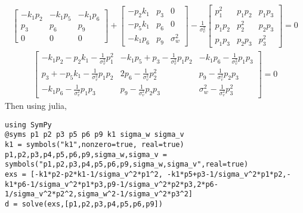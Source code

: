 \documentclass[paper=a4, fontsize=11pt]{scrartcl}
\numberwithin{equation}{section}		%
\numberwithin{figure}{section}			%
\numberwithin{table}{section}				%
\begin{document}
\begin{align*}
\begin{bmatrix}
-k_1p_2&-k_1p_5&-k_1p_6\\
p_3&p_6&p_9\\
0&0&0
\end{bmatrix}+
\begin{bmatrix}
-p_2k_1&p_3&0\\
-p_5k_1&p_6&0\\
-k_1p_6&p_9&\sigma_w^2
\end{bmatrix}-\frac{1}{\sigma_v^2}
\begin{bmatrix}
p_1^2&p_1p_2&p_1p_3\\
p_1p_2&p_2^2&p_2p_3\\
p_1p_3&p_2p_3&p_3^2
\end{bmatrix}=0
\end{align*}
\begin{align*}
\begin{bmatrix}
-k_1p_2-p_2k_1-\frac{1}{\sigma_v^2}p_1^2&-k_1p_5+p_3-\frac{1}{\sigma_v^2}p_1p_2&-k_1p_6-\frac{1}{\sigma_v^2}p_1p_3\\
p_3+-p_5k_1-\frac{1}{\sigma_v^2}p_1p_2&2p_6-\frac{1}{\sigma_v^2}p_2^2&p_9-\frac{1}{\sigma_v^2}p_2p_3\\
-k_1p_6-\frac{1}{\sigma_v^2}p_1p_3&p_9-\frac{1}{\sigma_v^2}p_2p_3&\sigma_w^2-\frac{1}{\sigma_v^2}p_3^2
\end{bmatrix}=0
\end{align*}
Then using julia,
\begin{tiny}
\begin{lstlisting}
using SymPy
@syms p1 p2 p3 p5 p6 p9 k1 sigma_w sigma_v
k1 = symbols("k1",nonzero=true, real=true)
p1,p2,p3,p4,p5,p6,p9,sigma_w,sigma_v = symbols("p1,p2,p3,p4,p5,p6,p9,sigma_w,sigma_v",real=true)
exs = [-k1*p2-p2*k1-1/sigma_v^2*p1^2, -k1*p5+p3-1/sigma_v^2*p1*p2,-k1*p6-1/sigma_v^2*p1*p3,p9-1/sigma_v^2*p2*p3,2*p6-1/sigma_v^2*p2^2,sigma_w^2-1/sigma_v^2*p3^2]
d = solve(exs,[p1,p2,p3,p4,p5,p6,p9])
\end{lstlisting}
\end{tiny}
\end{document}
